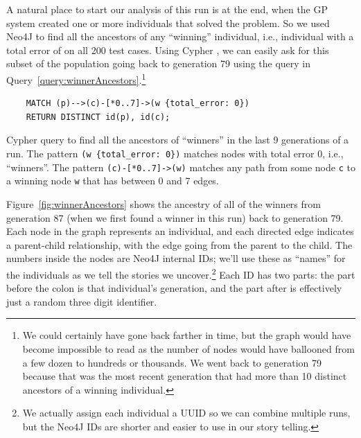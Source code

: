 A natural place to start our analysis of this run is at the end, when the GP system created one or more individuals that 
solved the problem. So we used Neo4J to find all the ancestors of any ``winning'' individual, i.e., individual with a total error of 
on all 200 test cases. Using Cypher%
, we can easily ask for this subset
of the population going back to generation 79 using the query in 
Query~\ref{query:winnerAncestors}.\footnote{We could certainly 
	have gone back farther in time, but the graph would have become impossible to read as the
	number of nodes would have ballooned from a few dozen to hundreds or thousands. We went
	back to generation 79 because that was the most recent generation that had more than 10
	distinct ancestors of a winning individual.}

\begin{Query}
	\smallskip
	\begin{verbatim}
	MATCH (p)-->(c)-[*0..7]->(w {total_error: 0}) 
	RETURN DISTINCT id(p), id(c);
	\end{verbatim}
	\caption{Cypher query to find all the ancestors of ``winners'' in the last 9 generations of a run.
		The pattern \texttt{(w \{total\_error: 0\})} matches nodes with total error 0, i.e., 
		``winners''. The pattern \texttt{(c)-[*0..7]->(w)} matches any path from some node \texttt{c} to
		a winning node \texttt{w} that has between 0 and 7 edges.
		}
	\label{query:winnerAncestors}
\end{Query}

Figure~\ref{fig:winnerAncestors} shows the ancestry of all of the winners from generation 87 
(when we first found a winner in this run) back to generation 79.
Each node in the graph represents an individual, and each directed edge indicates a parent-child
relationship, with the edge going from the parent to the child. The numbers inside the nodes are
Neo4J internal IDs; we'll use these as ``names'' for the individuals as we tell the stories 
we uncover.\footnote{We actually assign each individual a UUID so we can combine multiple runs, but
	the Neo4J IDs are shorter and easier to use in our story telling.} Each ID has two parts:
the part before the colon is that individual's generation, and the part after is effectively
just a random three digit identifier.

